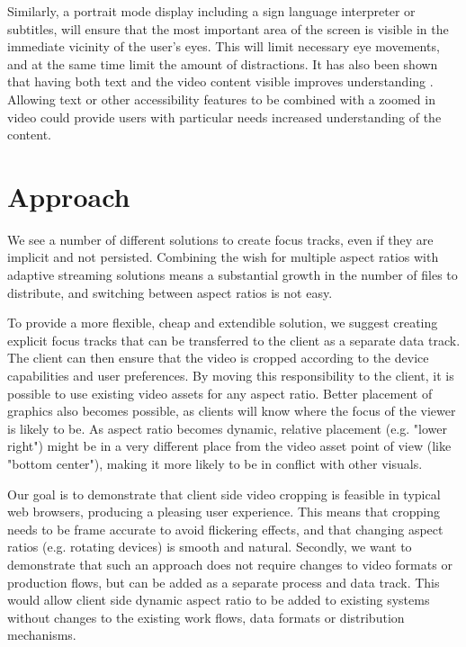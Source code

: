 \documentclass{aircc}
\begin{document}
Similarly, a portrait mode display including a sign language interpreter or
subtitles, will ensure that the most important area of the screen is visible
in the immediate vicinity of the user's eyes. This will limit necessary eye
movements, and at the same time limit the amount of distractions. It has also
been shown that having both text and the video content visible improves
understanding \cite{eyetracking}. Allowing text or other accessibility
features to be combined with a zoomed in video could provide users with
particular needs increased understanding of the content.


\section{Approach}

We see a number of different solutions to create focus tracks, even if they
are implicit and not persisted. Combining the wish for multiple aspect ratios
with adaptive streaming solutions means a substantial growth in the number of
files to distribute, and switching between aspect ratios is not easy.

To provide a more flexible, cheap and extendible solution, we suggest creating
explicit focus tracks that can be transferred to the client as a separate
data track. The client can then ensure that the video is cropped according to
the device capabilities and user preferences. By moving this responsibility
to the client, it is possible to use existing video assets for any aspect
ratio. Better placement of graphics also becomes possible, as clients will
know where the focus of the viewer is likely to be. As aspect ratio becomes
dynamic, relative placement (e.g. "lower right") might be in a very different
place from the video asset point of view (like "bottom center"), making it
more likely to be in conflict with other visuals. 

Our goal is to demonstrate that client side video cropping is feasible in
typical web browsers, producing a pleasing user experience. This means that
cropping needs to be frame accurate to avoid flickering effects, and that
changing aspect ratios (e.g. rotating devices) is smooth and natural.
Secondly, we want to demonstrate that such an approach does not require
changes to video formats or production flows, but can be added as a separate
process and data track. This would allow client side dynamic aspect ratio to
be added to existing systems without changes to the existing work flows, data
formats or distribution mechanisms.
\end{document}
